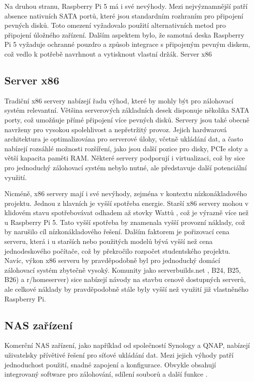 \documentclass[a4paper,12pt, oneside]{book}
\begin{document}
Na druhou stranu, Raspberry Pi 5 má i své nevýhody. Mezi nejvýznamnější patří
absence nativních SATA portů, které jsou standardním rozhraním pro připojení
pevných disků. Toto omezení vyžadovalo použití alternativních metod pro
připojení úložného zařízení. Dalším aspektem bylo, že samotná deska Raspberry Pi
5 vyžaduje ochranné pouzdro a způsob integrace s připojeným pevným diskem, což
vedlo k potřebě navrhnout a vytisknout vlastní držák. Server x86

\subsection{Server x86}
Tradiční x86 servery nabízejí řadu výhod, které by mohly být pro zálohovací
systém relevantní. Většina serverových základních desek disponuje několika SATA
porty, což umožňuje přímé připojení více pevných disků. Servery jsou také obecně
navrženy pro vysokou spolehlivost a nepřetržitý provoz. Jejich hardwarová
architektura je optimalizována pro serverové úlohy, včetně ukládání dat, a často
nabízejí rozsáhlé možnosti rozšíření, jako jsou další pozice pro disky, PCIe
sloty a větší kapacita paměti RAM. Některé servery podporují i virtualizaci, což
by sice pro jednoduchý zálohovací systém nebylo nutné, ale představuje další
potenciální využití.

Nicméně, x86 servery mají i své nevýhody, zejména v kontextu nízkonákladového
projektu. Jednou z hlavních je vyšší spotřeba energie. Starší x86 servery mohou
v klidovém stavu spotřebovávat odhadem až stovky Wattů , což je výrazně více
než u Raspberry Pi 5. Tato vyšší spotřeba by znamenala vyšší provozní náklady,
což by narušilo cíl nízkonákladového řešení. Dalším faktorem je
pořizovací cena serveru, která i u starších nebo použitých modelů bývá vyšší než
cena jednodeskového počítače, což by překročilo rozpočet studentského projektu.
Navíc, výkon x86 serveru by
pravděpodobně byl pro jednoduchý domácí zálohovací systém zbytečně vysoký.
Komunity jako serverbuilds.net , B24, B25, B26) a r/homeserver)
sice nabízejí návody na stavbu cenově dostupných serverů, ale celkové náklady by
pravděpodobně stále byly vyšší než využití již vlastněného Raspberry Pi.  

\subsection{NAS zařízení}

Komerční NAS zařízení, jako například od společností Synology a QNAP, nabízejí
uživatelsky přívětivé řešení pro síťové ukládání dat. Mezi jejich výhody patří
jednoduchost použití, snadné zapojení a konfigurace. Obvykle obsahují
integrovaný software pro zálohování, sdílení souborů a další funkce .  
\end{document}
